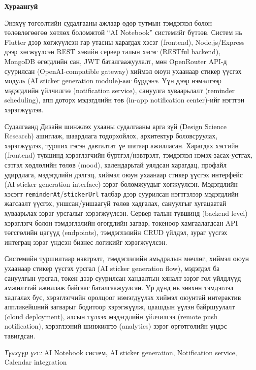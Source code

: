 
\vspace{10mm}

\begin{center}
\textbf{\large Хураангуй}
\end{center}

\sloppy

Энэхүү төгсөлтийн судалгааны ажлаар өдөр тутмын тэмдэглэл болон төлөвлөгөөгөө хөтлөх боломжтой “AI Notebook” системийг бүтээв. Систем нь Flutter дээр хөгжүүлсэн гар утасны харагдах хэсэг (frontend), Node.js/Express дээр хөгжүүлсэн REST хэвийн сервер талын хэсэг (RESTful backend), MongoDB өгөгдлийн сан, JWT баталгаажуулалт, мөн OpenRouter API-д суурилсан (OpenAI-compatible gateway) хиймэл оюун ухаанаар стикер үүсгэх модуль (AI sticker generation module)-аас бүрдэнэ. Үүн дээр нэмэлтээр мэдэгдлийн үйлчилгээ (notification service), сануулга хуваарьлалт (reminder scheduling), апп доторх мэдэгдлийн төв (in-app notification center)-ийг нэгтгэн хэрэгжүүлэв.

Судалгаанд Дизайн шинжлэх ухааны судалгааны арга зүй (Design Science Research) ашиглаж, шаардлага тодорхойлох, архитектур боловсруулах, хэрэгжүүлэх, турших гэсэн давталтат үе шатаар ажилласан. Харагдах хэсгийн (frontend) түвшинд хэрэглэгчийн бүртгэл/нэвтрэлт, тэмдэглэл нэмэх-засах-устгах, сэтгэл хөдлөлийн төлөв (mood), календарьтай уялдсан харагдац, профайл удирдлага, мэдэгдлийн дэлгэц, хиймэл оюун ухаанаар стикер үүсгэх интерфейс (AI sticker generation interface) зэрэг боломжуудыг хөгжүүлсэн. Мэдэгдлийн хэсэгт \texttt{reminderAt}/\texttt{stickerUrl} талбар дээр суурилсан нэгтгэлээр мэдэгдлийн жагсаалт үүсгэх, уншсан/уншаагүй төлөв хадгалах, сануулгыг хугацаатай хуваарьлах зэрэг урсгалыг хэрэгжүүлсэн. Сервер талын түвшинд (backend level) хэрэглэгч болон тэмдэглэлийн өгөгдлийн загвар, токеноор хамгаалагдсан API төгсгөлийн цэгүүд (endpoints), тэмдэглэлийн CRUD үйлдэл, зураг үүсгэх интеграц зэрэг үндсэн бизнес логикийг хэрэгжүүлсэн.

Системийн туршилтаар нэвтрэлт, тэмдэглэлийн амьдралын мөчлөг, хиймэл оюун ухаанаар стикер үүсгэх урсгал (AI sticker generation flow), мэдэгдэл ба сануулгын урсгал, токен дээр суурилсан хандалтын хяналт зэрэг гол үйлдлүүд амжилттай ажиллаж байгааг баталгаажуулсан. Үр дүнд нь зөвхөн тэмдэглэл хадгалах бус, хэрэглэгчийн оролцоог нэмэгдүүлэх хиймэл оюунтай интерактив аппликейшний загварыг бодитоор хэрэгжүүлж, цаашдын үүлэн байршуулалт (cloud deployment), алсын түлхэх мэдэгдлийн үйлчилгээ (remote push notification), хэрэглээний шинжилгээ (analytics) зэрэг өргөтгөлийн үндэс тавигдсан.

\vspace{3mm}
\textit{Түлхүүр үгс:} AI Notebook систем, AI sticker generation, Notification service, Calendar integration
